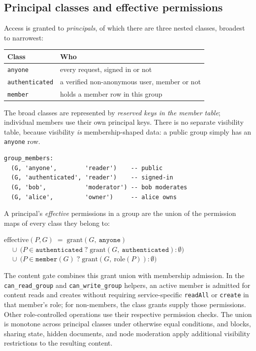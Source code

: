 \documentclass[sigconf, nonacm]{acmart}
\begin{document}
\subsection{Principal classes and effective permissions}

Access is granted to \emph{principals}, of which there are three nested
classes, broadest to narrowest:

\begin{center}
\small
\begin{tabular}{ll}
\toprule
\textbf{Class} & \textbf{Who} \\
\midrule
\texttt{anyone}        & every request, signed in or not \\
\texttt{authenticated} & a verified non-anonymous user, member or not \\
\texttt{member}        & holds a member row in this group \\
\bottomrule
\end{tabular}
\end{center}

The broad classes are represented by \emph{reserved keys in the member
table}; individual members use their own principal keys. There is no separate
visibility table, because visibility \emph{is} membership-shaped data: a
public group simply has an \texttt{anyone} row.

\begin{lstlisting}[style=sql]
group_members:
  (G, 'anyone',        'reader')    -- public
  (G, 'authenticated', 'reader')    -- signed-in
  (G, 'bob',           'moderator') -- bob moderates
  (G, 'alice',         'owner')     -- alice owns
\end{lstlisting}

A principal's \emph{effective} permissions in a group are the union of the
permission maps of every class they belong to:

\begin{center}
\small
$\mathrm{effective}(P, G) \;=\; \mathrm{grant}(G,\ \texttt{anyone})$\\
$\quad \cup\ \big(P \in \texttt{authenticated} \;?\; \mathrm{grant}(G,\ \texttt{authenticated}) : \emptyset\big)$\\
$\quad \cup\ \big(P \in \texttt{member}(G) \;?\; \mathrm{grant}(G,\ \mathrm{role}(P)) : \emptyset\big)$
\end{center}

The content gate combines this grant union with membership admission. In the
\texttt{can\_read\_group} and \texttt{can\_write\_group} helpers, an active
member is admitted for content reads and creates without requiring
service-specific \texttt{readAll} or \texttt{create} in that member's role;
for non-members, the class grants supply those permissions. Other
role-controlled operations use their respective permission checks. The union
is monotone across principal classes under otherwise equal conditions, and
blocks, sharing state, hidden documents, and node moderation apply additional
visibility restrictions to the resulting content.
\end{document}
